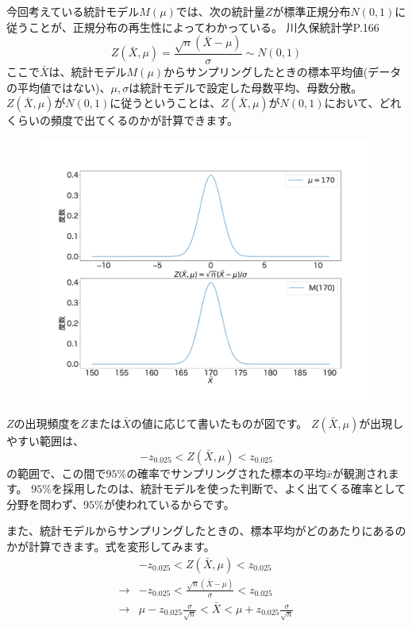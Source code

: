 今回考えている統計モデル$M(\mu)$では、次の統計量$Z$が標準正規分布$N(0,1)$に従うことが、正規分布の再生性によってわかっている。
 川久保統計学P.166
 \fi
$$
Z(\bar{X},\mu)=\frac{\sqrt{n}(\bar{X}-\mu)}{\sigma} \sim N(0,1)
$$
ここで$\bar{X}$は、統計モデル$M(\mu)$からサンプリングしたときの標本平均値(データの平均値ではない)、$\mu,\sigma$は統計モデルで設定した母数平均、母数分散。
$Z(\bar{X},\mu)$が$N(0,1)$に従うということは、$Z(\bar{X},\mu)$が$N(0,1)$において、どれくらいの頻度で出てくるのかが計算できます。

\begin{figure}
\begin{center}
    \includegraphics[width=15cm]{./image/03_/normal_Z_frequency.pdf}
  \end{center}
\end{figure}

$Z$の出現頻度を$Z$または$\bar{X}$の値に応じて書いたものが図です。
$Z(\bar{X},\mu)$が出現しやすい範囲は、
$$
-z_{0.025}<Z(\bar{X},\mu)<z_{0.025}
$$
の範囲で、この間で$95\%$の確率でサンプリングされた標本の平均$\bar{x}$が観測されます。
$95\%$を採用したのは、統計モデルを使った判断で、よく出てくる確率として分野を問わず、$95\%$が使われているからです。

また、統計モデルからサンプリングしたときの、標本平均がどのあたりにあるのかが計算できます。式を変形してみます。
\begin{eqnarray*}
    & -z_{0.025} < Z(\bar{X},\mu)<z_{0.025} \\
\rightarrow & -z_{0.025} < \frac{\sqrt{n}(\bar{X}-\mu)}{\sigma}  <z_{0.025} \\
\rightarrow & \mu - z_{0.025} \frac{\sigma}{\sqrt{n}} < \bar{X} < \mu + z_{0.025} \frac{\sigma}{\sqrt{n}}
\end{eqnarray*}

